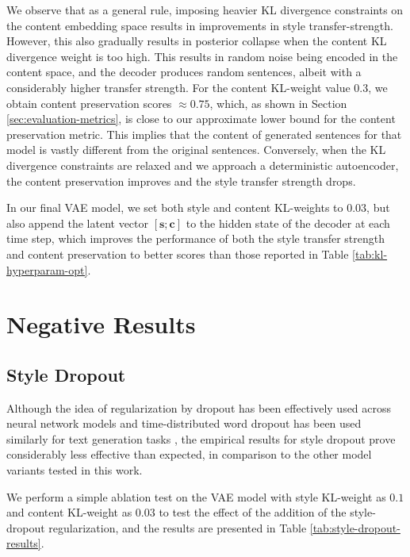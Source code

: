 We observe that as a general rule, imposing heavier KL divergence constraints on the content embedding space results in improvements in style transfer-strength. However, this also gradually results in posterior collapse when the content KL divergence weight is too high. This results in random noise being encoded in the content space, and the decoder produces random sentences, albeit with a considerably higher transfer strength. For the content KL-weight value 0.3, we obtain content preservation scores $\approx 0.75$, which, as shown in Section \ref{sec:evaluation-metrics}, is close to our approximate lower bound for the content preservation metric. This implies that the content of generated sentences for that model is vastly different from the original sentences. Conversely, when the KL divergence constraints are relaxed and we approach a deterministic autoencoder, the content preservation improves and the style transfer strength drops.

In our final VAE model, we set both style and content KL-weights to $0.03$, but also append the latent vector $[\bm s; \bm c]$ to the hidden state of the decoder at each time step, which improves the performance of both the style transfer strength and content preservation to better scores than those reported in Table \ref{tab:kl-hyperparam-opt}.


\section{Negative Results}

\subsection{Style Dropout}

Although the idea of regularization by dropout \citep{srivastava2014dropout} has been effectively used across neural network models and time-distributed word dropout has been used similarly for text generation tasks \citep{dai2015semi, bowman2016generating}, the empirical results for style dropout prove considerably less effective than expected, in comparison to the other model variants tested in this work.

We perform a simple ablation test on the VAE model with style KL-weight as $0.1$ and content KL-weight as $0.03$ to test the effect of the addition of the style-dropout regularization, and the results are presented in Table \ref{tab:style-dropout-results}.

